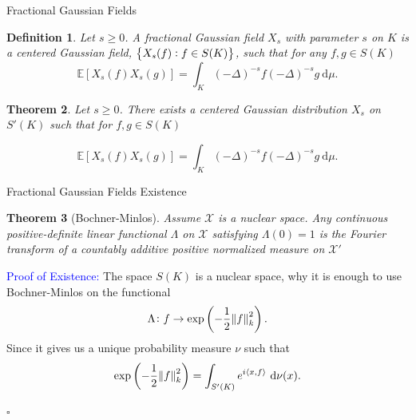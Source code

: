 \documentclass{beamer}
\newcounter{chapCount}
\newtheorem{theorems}{Theorem}[chapCount]
\newtheorem{defi}[theorems]{Definition}
\newcommand{\inn}[2]{\left\langle #1, #2 \right\rangle} %
\newcommand{\e}{\mathbb{E}}
\newcommand{\dd}{\ \text{d}}
\begin{document}
	\begin{frame}{Fractional Gaussian Fields}
		
		\vspace{2.5em}
		\begin{defi}\label{fracGaussianField}
			Let $s \geq 0$. A \emph{fractional Gaussian field} $X_s$ with parameter $s$ on $K$ is a centered Gaussian field, $\cbr{X_s(f): f \in S(K)}$, such that for any $f,g \in S(K)$
			\vspace{-1em}
			\begin{equation}
				\e \left[X_s(f) X_s(g)\right] = \int_{K} (-\Delta)^{-s}f (-\Delta)^{-s}g \dd \mu.
			\end{equation}
		\end{defi}
		\pause
		\setcounter{theorems}{6}
		\begin{theorems}
			Let $s \geq 0$. There exists a centered Gaussian distribution $X_s$ on $S'(K)$ such that for $f,g \in S(K)$
			
			\vspace{-0.5em}
			\begin{equation}
				\e \left[X_s(f)X_s(g) \right] = \int_{K} (-\Delta)^{-s}f (-\Delta)^{-s}g \dd \mu.
			\end{equation}
		\end{theorems}
	\end{frame}
	\begin{frame}{Fractional Gaussian Fields Existence}
		
		\vspace{3.5em}
		\setcounter{theorems}{4}
		\begin{theorems}[Bochner-Minlos]\label{BochnerMinlos}
			Assume $\mathcal{X}$ is a nuclear space. Any continuous positive-definite linear functional $\Lambda$ on $\mathcal{X}$ satisfying $\Lambda(0) = 1$ is the Fourier transform of a countably additive positive normalized measure on $\mathcal{X}'$
		\end{theorems}
		\pause

\vspace{-1em}
	\textcolor{blue}{Proof of Existence:} The space $S(K)$ is a nuclear space, why it is enough to use Bochner-Minlos on the functional
	\begin{equation}
		\Lambda \colon f \to \exp\left(-\frac{1}{2} \norm{f}^2_{k}\right).
	\end{equation}
	Since it gives us a unique probability measure $\nu$ such that
	\begin{equation}
		\exp \left(-\frac{1}{2} \norm{f}^{2}_{k}\right) = \int_{S'(K)} e^{i \inn{x}{f}} \dd \nu (x).
	\end{equation}
	
	\vspace{-3em}
	\hfill $\square$
\end{frame}
\end{document}
